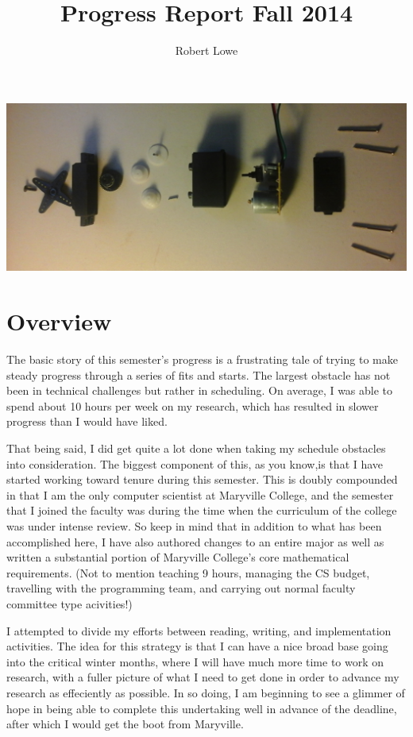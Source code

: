 \documentclass[12pt]{article}
\title{Progress Report Fall 2014}
\author{Robert Lowe}
\begin{document}
\maketitle

\includegraphics[width=\linewidth]{images/futabaExploded}
\section{Overview}
The basic story of this semester's progress is a frustrating tale of
trying to make steady progress through a series of fits and starts.
The largest obstacle has not been in technical challenges but rather
in scheduling.  On average, I was able to spend about 10 hours per
week on my research, which has resulted in slower progress than I
would have liked.

That being said, I did get quite a lot done when taking my schedule
obstacles into consideration.  The biggest component of this, as you
know,is that I have started working toward tenure during this
semester.  This is doubly compounded in that I am the only computer
scientist at Maryville College, and the semester that I joined the
faculty was during the time when the curriculum of the college was
under intense review.  So keep in mind that in addition to what has
been accomplished here, I have also authored changes to an entire
major as well as written a substantial portion of Maryville College's
core mathematical requirements.  (Not to mention teaching 9 hours,
managing the CS budget, travelling with the programming team, and
carrying out normal faculty committee type acivities!)

I attempted to divide my efforts between reading, writing, and
implementation activities.  The idea for this strategy is that I can
have a nice broad base going into the critical winter months, where I
will have much more time to work on research, with a fuller picture of
what I need to get done in order to advance my research as effeciently
as possible.  In so doing, I am beginning to see a glimmer of hope in
being able to complete this undertaking well in advance of the
deadline, after which I would  get the boot from Maryville.
\end{document}
